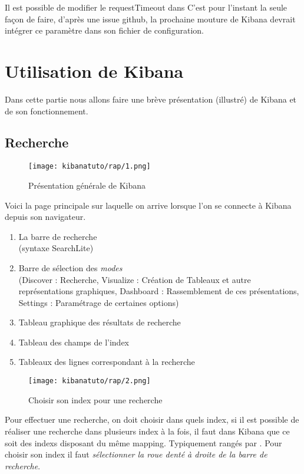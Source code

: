 Il est possible de modifier le requestTimeout dans 
C'est pour l'instant la seule façon de faire, d'après une issue github, la prochaine 
mouture de Kibana devrait intégrer ce paramètre dans son fichier de configuration.

\section{Utilisation de Kibana}
Dans cette partie nous allons faire une brève présentation (illustré) de Kibana et
de son fonctionnement.

\subsection{Recherche}
\begin{figure}[H]
\center
\texttt{[image: kibanatuto/rap/1.png]}
\label{fig:kibanatuto1}
\caption{Présentation générale de Kibana}
\end{figure}

Voici la page principale sur laquelle on arrive lorsque l'on se connecte à Kibana
depuis son navigateur.

\begin{enumerate}
    \item La barre de recherche \\(syntaxe SearchLite)
    \item Barre de sélection des \emph{modes} \\(Discover : Recherche, Visualize : Création 
    de Tableaux et autre représentations graphiques, Dashboard : Rassemblement de
    ces présentations, Settings : Paramétrage de certaines options)
    \item Tableau graphique des résultats de recherche
    \item Tableau des champs de l'index
    \item Tableaux des lignes correspondant à la recherche
\end{enumerate}


\begin{figure}[H]
\center
\texttt{[image: kibanatuto/rap/2.png]}
\label{fig:kibanatuto2}
\caption{Choisir son index pour une recherche}
\end{figure}
Pour effectuer une recherche, on doit choisir dans quels index, si il est possible 
de réaliser une recherche dans plusieurs index à la fois, il faut dans Kibana que 
ce soit des indexs disposant du même mapping. Typiquement rangés par .
Pour choisir son index il faut \emph{sélectionner la roue denté à droite de la barre
de recherche}.


